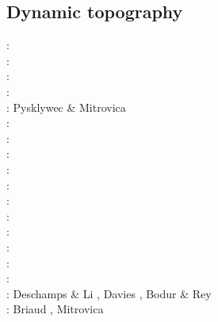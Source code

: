 \subsection{Dynamic topography} 

\begin{scriptsize}
\nineteeneightyfive: \cite{hacr85}\\
\nineteeneightyseven: \cite{repa87}\\
\nineteenninetytwo: \cite{kiha92}\\
\nineteenninetythree: \cite{gurn93}\cite{gurn93b}\\
\nineteenninetyseven: Pysklywec \& Mitrovica \cite{pymi97}\\
\nineteenninetynine: \cite{bumo99}\\
\twothousandthree: \cite{cogu03}\\
\twothousandnine: \cite{cohu09}\\
\twothousandten: \cite{bofb10}\cite{brau10}\cite{stfh10}\cite{shml10}\\
\twothousandeleven: \cite{rapy11}\\
\twothousandtwelve: \cite{shlm12}\cite{zhzf12}\\
\twothousandthirteen: \cite{brrs13}\cite{flgm13}\\
\twothousandfifteen: \cite{aupm15}\cite{kiff15}\cite{dali15}\\
\twothousandsixteen: \cite{howa16}\cite{gvfb16}\cite{yagu16}\cite{stei16}\cite{cogb16}\\
\twothousandseventeen: \cite{yamm17}\cite{aumh17}\cite{grrb17}\\
\twothousandeighteen: \cite{osss18}\cite{vibc18}\\
\twothousandnineteen: Deschamps \& Li \cite{deli19}, Davies \etal \cite{davk19}, 
                      Bodur \& Rey \cite{bore19}\\
\twothousandtwenty: Briaud \etal \cite{braf20}, Mitrovica \etal \cite{miac20}
\end{scriptsize}




